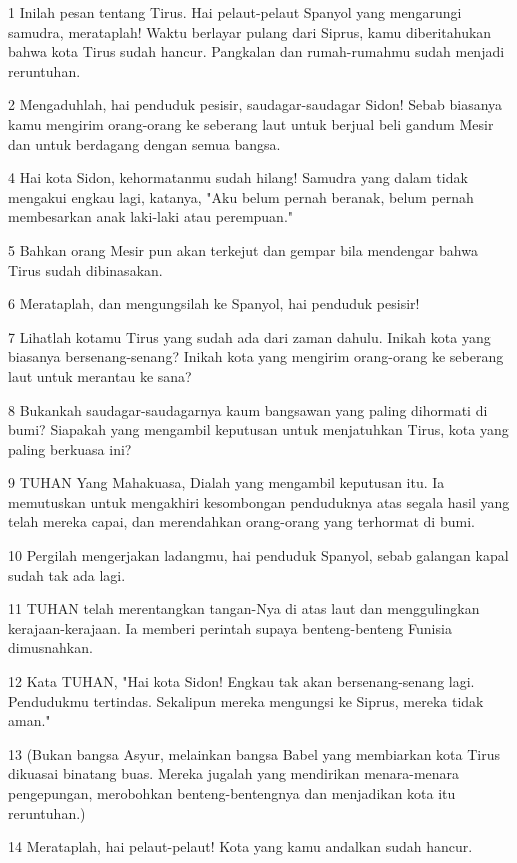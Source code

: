 \par 1 Inilah pesan tentang Tirus. Hai pelaut-pelaut Spanyol yang mengarungi samudra, merataplah! Waktu berlayar pulang dari Siprus, kamu diberitahukan bahwa kota Tirus sudah hancur. Pangkalan dan rumah-rumahmu sudah menjadi reruntuhan.
\par 2 Mengaduhlah, hai penduduk pesisir, saudagar-saudagar Sidon! Sebab biasanya kamu mengirim orang-orang ke seberang laut untuk berjual beli gandum Mesir dan untuk berdagang dengan semua bangsa.
\par 4 Hai kota Sidon, kehormatanmu sudah hilang! Samudra yang dalam tidak mengakui engkau lagi, katanya, "Aku belum pernah beranak, belum pernah membesarkan anak laki-laki atau perempuan."
\par 5 Bahkan orang Mesir pun akan terkejut dan gempar bila mendengar bahwa Tirus sudah dibinasakan.
\par 6 Merataplah, dan mengungsilah ke Spanyol, hai penduduk pesisir!
\par 7 Lihatlah kotamu Tirus yang sudah ada dari zaman dahulu. Inikah kota yang biasanya bersenang-senang? Inikah kota yang mengirim orang-orang ke seberang laut untuk merantau ke sana?
\par 8 Bukankah saudagar-saudagarnya kaum bangsawan yang paling dihormati di bumi? Siapakah yang mengambil keputusan untuk menjatuhkan Tirus, kota yang paling berkuasa ini?
\par 9 TUHAN Yang Mahakuasa, Dialah yang mengambil keputusan itu. Ia memutuskan untuk mengakhiri kesombongan penduduknya atas segala hasil yang telah mereka capai, dan merendahkan orang-orang yang terhormat di bumi.
\par 10 Pergilah mengerjakan ladangmu, hai penduduk Spanyol, sebab galangan kapal sudah tak ada lagi.
\par 11 TUHAN telah merentangkan tangan-Nya di atas laut dan menggulingkan kerajaan-kerajaan. Ia memberi perintah supaya benteng-benteng Funisia dimusnahkan.
\par 12 Kata TUHAN, "Hai kota Sidon! Engkau tak akan bersenang-senang lagi. Pendudukmu tertindas. Sekalipun mereka mengungsi ke Siprus, mereka tidak aman."
\par 13 (Bukan bangsa Asyur, melainkan bangsa Babel yang membiarkan kota Tirus dikuasai binatang buas. Mereka jugalah yang mendirikan menara-menara pengepungan, merobohkan benteng-bentengnya dan menjadikan kota itu reruntuhan.)
\par 14 Merataplah, hai pelaut-pelaut! Kota yang kamu andalkan sudah hancur.
